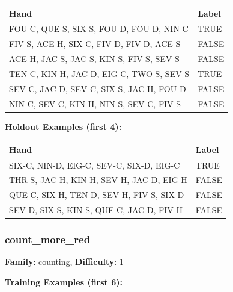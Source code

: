 \documentclass[10pt,a4paper]{article}
\begin{document}
\begin{small}
\begin{tabular}{p{8cm}l}
\toprule
Hand & Label \\
\midrule
FOU-C, QUE-S, SIX-S, FOU-D, FOU-D, NIN-C & \textcolor{positive}{TRUE} \\
FIV-S, ACE-H, SIX-C, FIV-D, FIV-D, ACE-S & \textcolor{negative}{FALSE} \\
ACE-H, JAC-S, JAC-S, KIN-S, FIV-S, SEV-S & \textcolor{negative}{FALSE} \\
TEN-C, KIN-H, JAC-D, EIG-C, TWO-S, SEV-S & \textcolor{positive}{TRUE} \\
SEV-C, JAC-D, SEV-C, SIX-S, JAC-H, FOU-D & \textcolor{negative}{FALSE} \\
NIN-C, SEV-C, KIN-H, NIN-S, SEV-C, FIV-S & \textcolor{negative}{FALSE} \\
\bottomrule
\end{tabular}
\end{small}

\textbf{Holdout Examples (first 4):}

\begin{small}
\begin{tabular}{p{8cm}l}
\toprule
Hand & Label \\
\midrule
SIX-C, NIN-D, EIG-C, SEV-C, SIX-D, EIG-C & \textcolor{positive}{TRUE} \\
THR-S, JAC-H, KIN-H, SEV-H, JAC-D, EIG-H & \textcolor{negative}{FALSE} \\
QUE-C, SIX-H, TEN-D, SEV-H, FIV-S, SIX-D & \textcolor{negative}{FALSE} \\
SEV-D, SIX-S, KIN-S, QUE-C, JAC-D, FIV-H & \textcolor{negative}{FALSE} \\
\bottomrule
\end{tabular}
\end{small}

\vspace{0.5cm}

\subsubsection{count\_more\_red}

\textbf{Family}: counting, \textbf{Difficulty}: 1

\textbf{Training Examples (first 6):}
\end{document}
